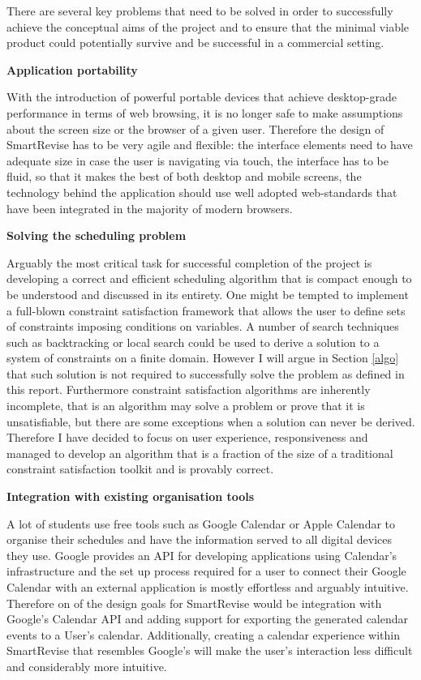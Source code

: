 \documentclass[bsc,frontabs,twoside,singlespacing,parskip]{infthesis}     %
\begin{document}
	There are several key problems that need to be solved in order to successfully achieve the conceptual aims of the project and to ensure that the minimal viable product could potentially survive and be successful in a commercial setting.
	
	\textbf{Application portability}
	
	With the introduction of powerful portable devices that achieve desktop-grade performance in terms of web browsing, it is no longer safe to make assumptions about the screen size or the browser of a given user. Therefore the design of SmartRevise has to be very agile and flexible: the interface elements need to have adequate size in case the user is navigating via touch, the interface has to be fluid, so that it makes the best of both desktop and mobile screens, the technology behind the application should use well adopted web-standards that have been integrated in the majority of modern browsers.
		
	\textbf{Solving the scheduling problem}
	
	Arguably the most critical task for successful completion of the project is developing a correct and efficient scheduling algorithm that is compact enough to be understood and discussed in its entirety. One might be tempted to implement a full-blown constraint satisfaction framework that allows the user to define sets of constraints imposing conditions on variables. A number of search techniques such as backtracking or local search could be used to derive a solution to a system of constraints on a finite domain. However I will argue in Section \ref{algo} that such solution is not required to successfully solve the problem as defined in this report. Furthermore constraint satisfaction algorithms are inherently incomplete, that is an algorithm may solve a problem or prove that it is unsatisfiable, but there are some exceptions when a solution can never be derived. Therefore I have decided to focus on user experience, responsiveness and managed to develop an algorithm that is a fraction of the size of a traditional constraint satisfaction toolkit and is provably correct.
	
	\textbf{Integration with existing organisation tools}
	
	A lot of students use free tools such as Google Calendar or Apple Calendar to organise their schedules and have the information served to all digital devices they use. Google provides an API for developing applications using Calendar's infrastructure and the set up process required for a user to connect their Google Calendar with an external application is mostly effortless and arguably intuitive. Therefore on of the design goals for SmartRevise would be integration with Google's Calendar API and adding support for exporting the generated calendar events to a User's calendar. Additionally, creating a calendar experience within SmartRevise that resembles Google's will make the user's interaction less difficult and considerably more intuitive.
\end{document}

